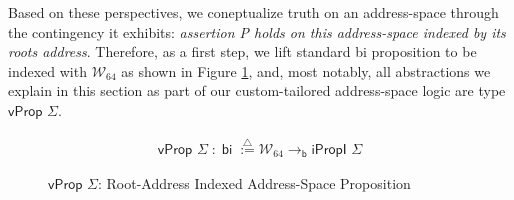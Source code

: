 Based on these perspectives, we coneptualize truth on an address-space through the contingency it exhibits: \textit{assertion P holds on this address-space indexed by its roots address}. Therefore, as a first step, we lift standard bi proposition to be indexed with $\mathcal{W}_{64}$ as shown in Figure \ref{fig:vprop}, and, most notably, all abstractions we explain in this section as part of our custom-tailored address-space logic are type $\textsf{vProp }\Sigma$.
\begin{figure}[!ht]
\[
\begin{array}{cl}
\textsf{vProp } \Sigma \; : \; \textsf{bi} \; \stackrel{{\triangle}}{:=} \mathcal{W}_{64} \rightarrow_{\textsf{b}} \textsf{iPropI } \Sigma
\end{array}
\]
\caption{$\textsf{vProp }\Sigma$: Root-Address Indexed Address-Space Proposition}
  \label{fig:vprop}
\end{figure}
